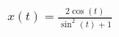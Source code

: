 \documentclass[preview]{standalone}
\begin{document}
\begin{align*}
x(t) = \frac{2  \cos(t)}{\sin^2(t) + 1}
\end{align*}
\end{document}
